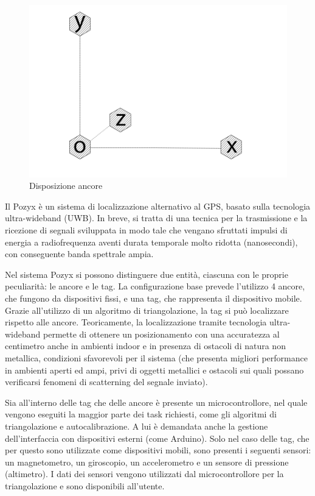 \begin{figure}[h]
	\centering
	\includegraphics[height=0.2\textheight]{uwb_axis.png}
	\caption{Disposizione ancore}
	\label{fig: disposizione ancore}
\end{figure}


Il Pozyx è un sistema di localizzazione alternativo al GPS, basato sulla tecnologia ultra-wideband
(UWB). In breve, si tratta di una tecnica per la trasmissione e la ricezione di segnali sviluppata in modo tale che vengano sfruttati impulsi di energia 
a radiofrequenza aventi durata temporale molto ridotta (nanosecondi), con conseguente banda spettrale ampia.

Nel sistema Pozyx si possono distinguere due entità, ciascuna con le proprie peculiarità: le ancore e le tag.
La configurazione base prevede l'utilizzo 4 ancore, che fungono da dispositivi fissi, e una tag, che rappresenta il dispositivo mobile.
Grazie all'utilizzo di un algoritmo di triangolazione, la tag si può localizzare rispetto alle ancore. Teoricamente, la localizzazione tramite tecnologia 
ultra-wideband permette di ottenere un posizionamento con una accuratezza al centimetro anche
in ambienti indoor e in presenza di ostacoli di natura non metallica, condizioni sfavorevoli per il sistema (che presenta 
migliori performance in ambienti aperti ed ampi, privi di oggetti metallici e ostacoli sui quali possano verificarsi fenomeni di scatterning 
del segnale inviato). 

Sia all'interno delle tag che delle ancore è presente un microcontrollore, nel quale vengono eseguiti la maggior parte dei task richiesti, come gli algoritmi di triangolazione e autocalibrazione. 
A lui è demandata anche la gestione dell’interfaccia con dispositivi esterni (come Arduino).
Solo nel caso delle tag, che per questo sono utilizzate come dispositivi mobili, sono presenti i seguenti sensori: un magnetometro, un giroscopio, un accelerometro e un sensore di pressione (altimetro). I dati dei sensori vengono utilizzati dal microcontrollore per la triangolazione e sono disponibili all’utente.

